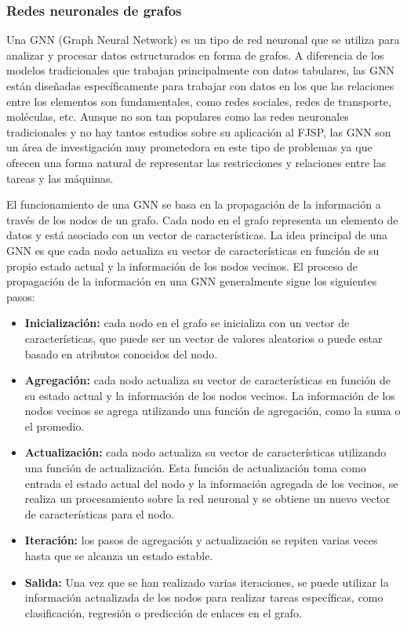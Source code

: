 \subsubsection{Redes neuronales de grafos}
Una GNN (Graph Neural Network)\cite{pytorch-geometric} es un tipo de red neuronal que 
se utiliza para analizar y procesar datos estructurados en forma de grafos. A diferencia de los modelos 
tradicionales que trabajan principalmente con datos tabulares, las GNN están diseñadas específicamente para trabajar 
con datos en los que las relaciones entre los elementos son fundamentales, como redes sociales, redes 
de transporte, moléculas, etc. Aunque no son tan populares como las redes neuronales tradicionales y no
hay tantos estudios sobre su aplicación al FJSP, las GNN son un área de investigación muy prometedora en
este tipo de problemas ya que ofrecen una forma natural de representar las restricciones y relaciones
entre las tareas y las máquinas.\medskip

El funcionamiento de una GNN se basa en la propagación de la información\cite{Message_parrs} a través de los nodos de un grafo. 
Cada nodo en el grafo representa un elemento de datos y está asociado con un vector de características. 
La idea principal de una GNN es que cada nodo actualiza su vector de características en función de su propio 
estado actual y la información de los nodos vecinos. El proceso de propagación de la información en una GNN 
generalmente sigue los siguientes pasos:

\begin{itemize}
    \item \textbf{Inicialización:} cada nodo en el grafo se inicializa con un vector de características,
    que puede ser un vector de valores aleatorios o puede estar basado en atributos conocidos del nodo.
    \item \textbf{Agregación:} cada nodo actualiza su vector de características en función de su estado
    actual y la información de los nodos vecinos. La información de los nodos vecinos se agrega utilizando
    una función de agregación, como la suma o el promedio.
    \item \textbf{Actualización:} cada nodo actualiza su vector de características utilizando una función
    de actualización. Esta función de actualización toma como entrada el estado actual del nodo y la 
    información agregada de los vecinos, se realiza un procesamiento sobre la red neuronal y se obtiene
    un nuevo vector de características para el nodo.
    \item \textbf{Iteración:} los pasos de agregación y actualización se repiten varias veces hasta que
    se alcanza un estado estable.
    \item \textbf{Salida:} Una vez que se han realizado varias iteraciones, se puede utilizar la información
    actualizada de los nodos para realizar tareas específicas, como clasificación, regresión o predicción de 
    enlaces en el grafo.
\end{itemize}

